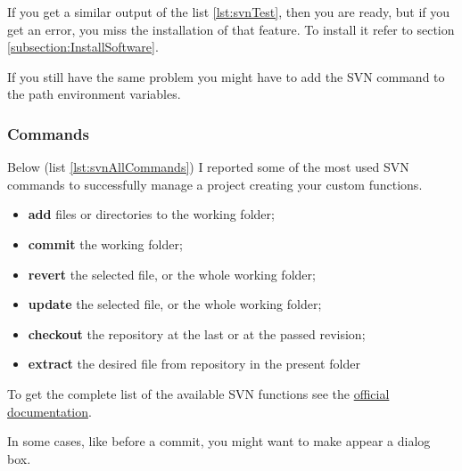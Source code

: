 If you get a similar output of the list \ref{lst:svnTest}, then you are ready, but if you get an error, you miss the installation of that feature. To install it refer to section \ref{subsection:InstallSoftware}.

If you still have the same problem you might have to add the SVN command to the path environment variables.

\subsubsection{Commands}

Below (list \ref{lst:svnAllCommands}) I reported some of the most used SVN commands to successfully manage a project creating your custom functions.

\begin{itemize}

\item \textbf{add} files or directories to the working folder;

\item \textbf{commit} the working folder;

\item \textbf{revert} the selected file, or the whole working folder;

\item \textbf{update} the selected file, or the whole working folder;

\item \textbf{checkout} the repository at the last or at the passed revision;

\item \textbf{extract} the desired file from repository in the present folder

\end{itemize}

To get the complete list of the available SVN functions see the \href{http://svnbook.red-bean.com/en/1.7/svn.ref.html}{official documentation}.



In some cases, like before a commit, you might want to make appear a dialog box.

